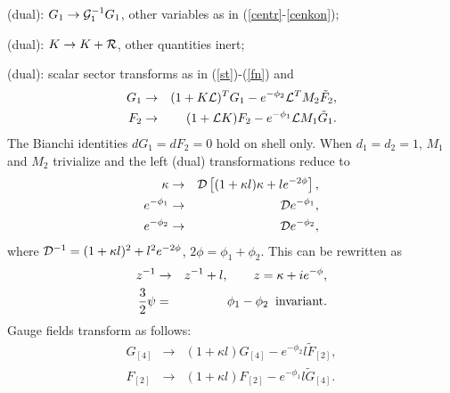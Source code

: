 \documentclass[a4paper,12pt]{article}
\begin{document}
\begin{appendix}
\smallskip
{} (dual): $G_1 \to {\cal G}_1^{-1} G_1$,
other variables as in (\ref{centr}-\ref{cenkon});

\smallskip
{} (dual): $K \to K + {\cal R}$, other
quantities inert;

\smallskip
{} (dual): scalar sector transforms as in
(\ref{st})-(\ref{fn}) and
\begin{eqnarray}
G_1 &\to& (1 + K{\cal L})^T G_1 - e^{-\phi_2} {\cal L}^T M_2
\tilde F_2,\\
F_2 &\to& (1 + {\cal L}K) F_2 - e^{-\phi_1} {\cal L} M_1 \tilde
G_1.
\end{eqnarray}
The Bianchi identities $dG_1 = dF_2 = 0$ hold on shell only.
When $d_1=d_2=1$, $M_1$ and $M_2$ trivialize  and the left
(dual) transformations reduce to
\begin{eqnarray}
\kappa &\to& {\cal D} \left[ (1+\kappa l) \kappa + l e^{-2\phi}
\right], \\
e^{-\phi_1} &\to& {\cal D} e^{-\phi_1}, \\
e^{-\phi_2} &\to& {\cal D} e^{-\phi_2},
\end{eqnarray}
where ${\cal D}^{-1}=(1+\kappa l)^2+l^2e^{-2\phi}$,
$2\phi=\phi_1+\phi_2$. This can be rewritten as
\begin{eqnarray}
z^{-1} &\to& z^{-1} + l, \qquad
z = \kappa + i e^{-\phi}, \nonumber \\
\frac32 \psi &=& \phi_1 - \phi_2  \;\;\hbox{invariant}.
\label{l1}
\end{eqnarray}
Gauge fields transform as follows:
\begin{eqnarray}
G_{[4]} &\to& (1 + \kappa l) G_{[4]} - e^{-\phi_2}l
\tilde F_{[2]}, \nonumber \\
F_{[2]} &\to& (1 + \kappa l) F_{[2]} - e^{-\phi_1}l \tilde
G_{[4]}. \label{l2}
\end{eqnarray}



\end{appendix}
\end{document}
